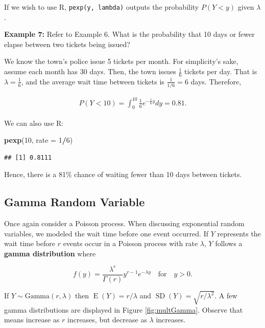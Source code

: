 \documentclass[
]{krantz}
\newenvironment{Shaded}{\begin{snugshade}}{\end{snugshade}}
\newcommand{\DataTypeTok}[1]{\textcolor[rgb]{0.27,0.27,0.27}{#1}}
\newcommand{\DecValTok}[1]{\textcolor[rgb]{0.06,0.06,0.06}{#1}}
\newcommand{\KeywordTok}[1]{\textcolor[rgb]{0.27,0.27,0.27}{\textbf{#1}}}
\newcommand{\NormalTok}[1]{#1}
\newcommand{\OperatorTok}[1]{\textcolor[rgb]{0.43,0.43,0.43}{\textbf{#1}}}
\newcommand{\E}{\operatorname{E}}
\newcommand{\SD}{\operatorname{SD}}
\begin{document}
If we wish to use R, \texttt{pexp(y,\ lambda)} outputs the probability \(P(Y < y)\) given \(\lambda\).

\textbf{Example 7:} Refer to Example 6. What is the probability that 10 days or fewer elapse between two tickets being issued?

We know the town's police issue 5 tickets per month. For simplicity's sake, assume each month has 30 days. Then, the town issues \(\frac{1}{6}\) tickets per day. That is \(\lambda = \frac{1}{6}\), and the average wait time between tickets is \(\frac{1}{1/6} = 6\) days. Therefore,

\begin{align*}
P(Y < 10) = \int_{0}^{10} \textstyle \frac16 e^{-\frac16y} dy = 0.81.
\end{align*}

We can also use R:

\begin{Shaded}
\begin{Highlighting}[]
\KeywordTok{pexp}\NormalTok{(}\DecValTok{10}\NormalTok{, }\DataTypeTok{rate =} \DecValTok{1}\OperatorTok{/}\DecValTok{6}\NormalTok{)}
\end{Highlighting}
\end{Shaded}

\begin{verbatim}
## [1] 0.8111
\end{verbatim}

Hence, there is a 81\% chance of waiting fewer than 10 days between tickets.

\hypertarget{gamma-random-variable}{%
\subsection{Gamma Random Variable}\label{gamma-random-variable}}

Once again consider a Poisson process. When discussing exponential random variables, we modeled the wait time before one event occurred. If \(Y\) represents the wait time before \(r\) events occur in a Poisson process with rate \(\lambda\), \(Y\) follows a \textbf{gamma distribution}  where

\begin{equation}
f(y) = \frac{\lambda^r}{\Gamma(r)} y^{r-1} e^{-\lambda y}\quad \textrm{for} \quad y >0.
\label{eq:gammaRV}
\end{equation}

If \(Y \sim \textrm{Gamma}(r, \lambda)\) then \(\E(Y) = r/\lambda\) and \(\SD(Y) = \sqrt{r/\lambda^2}\). A few gamma distributions are displayed in Figure \ref{fig:multGamma}. Observe that means increase as \(r\) increases, but decrease as \(\lambda\) increases.
\end{document}

